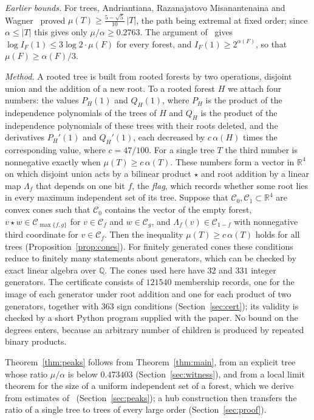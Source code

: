 \documentclass{amsart}
\numberwithin{equation}{section}
\theoremstyle{plain}
\theoremstyle{definition}
\theoremstyle{remark}
\newcommand{\R}{\mathbb{R}}
\newcommand{\C}{\mathcal{C}}
\begin{document}
\medskip
\noindent\emph{Earlier bounds.} For trees, Andriantiana, Razanajatovo Misanantenaina and Wagner~\cite[Lemma~4.2 and Theorem~4.4]{AMW} proved $\mu(T)\ge\frac{5-\sqrt5}{10}\,|T|$, the path being extremal at fixed order; since $\alpha\le|T|$ this gives only $\mu/\alpha\ge0.2763$. The argument of~\cite[(7.2)]{FLNYZ} gives $\log I_F(1)\le 3\log2\cdot\mu(F)$ for every forest, and $I_F(1)\ge2^{\alpha(F)}$, so that $\mu(F)\ge\alpha(F)/3$.

\medskip
\noindent\emph{Method.} A rooted tree is built from rooted forests by two operations, disjoint union and the addition of a new root. To a rooted forest $H$ we attach four numbers: the values $P_H(1)$ and $Q_H(1)$, where $P_H$ is the product of the independence polynomials of the trees of $H$ and $Q_H$ is the product of the independence polynomials of these trees with their roots deleted, and the derivatives $P_H'(1)$ and $Q_H'(1)$, each decreased by $c\,\alpha(H)$ times the corresponding value, where $c=47/100$. For a single tree $T$ the third number is nonnegative exactly when $\mu(T)\ge c\,\alpha(T)$. These numbers form a vector in $\R^4$ on which disjoint union acts by a bilinear product $\star$ and root addition by a linear map $\Lambda_f$ that depends on one bit $f$, the \emph{flag}, which records whether some root lies in every maximum independent set of its tree. Suppose that $\C_0,\C_1\subset\R^4$ are convex cones such that $\C_0$ contains the vector of the empty forest, $v\star w\in\C_{\max\{f,g\}}$ for $v\in\C_f$ and $w\in\C_g$, and $\Lambda_f(v)\in\C_{1-f}$ with nonnegative third coordinate for $v\in\C_f$. Then the inequality $\mu(T)\ge c\,\alpha(T)$ holds for all trees (Proposition~\ref{prop:cones}). For finitely generated cones these conditions reduce to finitely many statements about generators, which can be checked by exact linear algebra over $\mathbb Q$. The cones used here have $32$ and $331$ integer generators. The certificate consists of $121540$ membership records, one for the image of each generator under root addition and one for each product of two generators, together with $363$ sign conditions (Section~\ref{sec:cert}); its validity is checked by a short Python program supplied with the paper. No bound on the degrees enters, because an arbitrary number of children is produced by repeated binary products.

Theorem~\ref{thm:peaks} follows from Theorem~\ref{thm:main}, from an explicit tree whose ratio $\mu/\alpha$ is below $0.473403$ (Section~\ref{sec:witness}), and from a local limit theorem for the size of a uniform independent set of a forest, which we derive from estimates of~\cite{FLNYZ} (Section~\ref{sec:peaks}); a hub construction then transfers the ratio of a single tree to trees of every large order (Section~\ref{sec:proof}).
\end{document}
